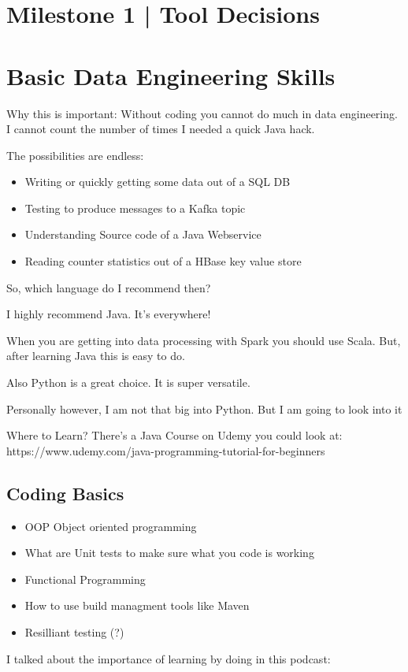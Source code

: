 \documentclass[12pt]{scrartcl} %
\begin{document}
\section{Milestone 1 | Tool Decisions}



\section{Basic Data Engineering Skills}

Why this is important: Without coding you cannot do much in data engineering. I cannot count the number of times I needed a quick Java hack.

The possibilities are endless:

\begin{itemize}
\item Writing or quickly getting some data out of a SQL DB
\item Testing to produce messages to a Kafka topic
\item Understanding Source code of a Java Webservice
\item Reading counter statistics out of a HBase key value store
\end{itemize}
So, which language do I recommend then?

I highly recommend Java. It’s everywhere!

When you are getting into data processing with Spark you should use Scala. But, after learning Java this is easy to do.

Also Python is a great choice. It is super versatile.

Personally however, I am not that big into Python. But I am going to look into it

Where to Learn?
There’s a Java Course on Udemy you could look at: https://www.udemy.com/java-programming-tutorial-for-beginners

\subsection{Coding Basics}
\begin{itemize}
\item OOP Object oriented programming
\item What are Unit tests to make sure what you code is working
\item Functional Programming
\item How to use build managment tools like Maven
\item Resilliant testing (?)
\end{itemize}
I talked about the importance of learning by doing in this podcast:
\end{document}
